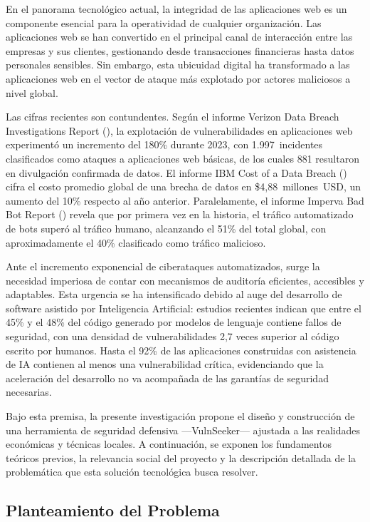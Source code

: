 \documentclass[12pt, a4paper]{article}
\begin{document}
En el panorama tecnológico actual, la integridad de las aplicaciones web es
un componente esencial para la operatividad de cualquier organización. Las
aplicaciones web se han convertido en el principal canal de interacción entre
las empresas y sus clientes, gestionando desde transacciones financieras
hasta datos personales sensibles. Sin embargo, esta ubicuidad digital ha
transformado a las aplicaciones web en el vector de ataque más explotado
por actores maliciosos a nivel global.

Las cifras recientes son contundentes. Según el informe Verizon Data Breach
Investigations Report (\cite{verizon2024}), la explotación de
vulnerabilidades en aplicaciones web experimentó un incremento del 180\%
durante 2023, con 1.997~incidentes clasificados como ataques a aplicaciones
web básicas, de los cuales 881 resultaron en divulgación confirmada de datos.
El informe IBM Cost of a Data Breach (\cite{ibm2024}) cifra el costo
promedio global de una brecha de datos en \$4,88~millones~USD, un aumento
del 10\% respecto al año anterior. Paralelamente, el informe Imperva Bad Bot
Report (\cite{imperva2025}) revela que por primera vez en la historia, el
tráfico automatizado de bots superó al tráfico humano, alcanzando el 51\%
del total global, con aproximadamente el 40\% clasificado como tráfico
malicioso.

Ante el incremento exponencial de ciberataques automatizados, surge la
necesidad imperiosa de contar con mecanismos de auditoría eficientes,
accesibles y adaptables. Esta urgencia se ha intensificado debido al auge
del desarrollo de software asistido por Inteligencia Artificial: estudios
recientes indican que entre el 45\% y el 48\% del código generado por
modelos de lenguaje contiene fallos de seguridad, con una densidad de
vulnerabilidades 2,7 veces superior al código escrito por humanos. Hasta
el 92\% de las aplicaciones construidas con asistencia de IA contienen al
menos una vulnerabilidad crítica, evidenciando que la aceleración del
desarrollo no va acompañada de las garantías de seguridad necesarias.

Bajo esta premisa, la presente investigación propone el diseño y
construcción de una herramienta de seguridad defensiva ---VulnSeeker---
ajustada a las realidades económicas y técnicas locales. A continuación, se
exponen los fundamentos teóricos previos, la relevancia social del proyecto
y la descripción detallada de la problemática que esta solución tecnológica
busca resolver.

\subsection{Planteamiento del Problema}
\end{document}
